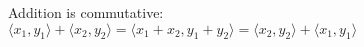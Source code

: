 \documentclass[preview]{standalone}
\begin{document}
\begin{center}
Addition is commutative: $\langle x_1, y_1 \rangle + \langle x_2, y_2 \rangle = \langle x_1 + x_2, y_1 + y_2 \rangle = \langle x_2, y_2 \rangle + \langle x_1, y_1 \rangle $
\end{center}
\end{document}
